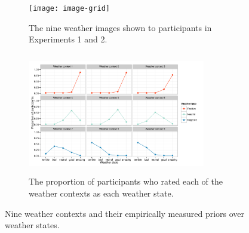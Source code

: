 \documentclass[10pt,letterpaper]{article}
\begin{document}
\begin{figure}
    \begin{subfigure}[b]{0.5\textwidth}
        \texttt{[image: image-grid]}
        \caption{The nine weather images shown to participants in Experiments 1 and 2.}
        \label{images}
    \end{subfigure}
    \hfill
    \begin{subfigure}[b]{0.5\textwidth}
        \includegraphics[width=220pt, height=150pt]{priors}
        \caption{The proportion of participants who rated each of the weather contexts as each weather state. 
     }
        \label{priors}
    \end{subfigure}
    \caption{Nine weather contexts and their empirically measured priors over weather states.}
    \label{fig:three graphs}
\end{figure}
\end{document}
